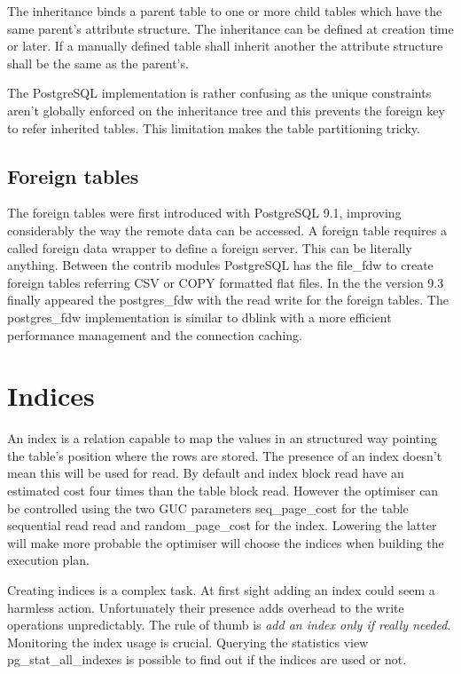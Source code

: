 The inheritance binds a parent table to one or more child tables which have 
the same parent's attribute structure. The inheritance can be defined at 
creation time or later. If a manually defined table shall inherit another the 
attribute structure shall be the same as the parent's.

The PostgreSQL implementation is rather confusing as the unique constraints 
aren't globally enforced on the inheritance tree and this prevents the foreign 
key to refer inherited tables. This limitation makes the table 
partitioning tricky.

\subsection{Foreign tables}
The foreign tables were first introduced with PostgreSQL 9.1, improving 
considerably the way the remote data can be accessed. 
A foreign table requires a called foreign data wrapper to define a foreign 
server. This can be literally anything. Between the contrib modules PostgreSQL 
has the file\_fdw to create foreign tables referring CSV or COPY formatted flat 
files. In the the version 9.3 finally appeared the postgres\_fdw with the read 
write for the foreign tables. The postgres\_fdw implementation is similar to 
dblink with a more efficient performance management and the connection caching.


\section{Indices}
An index is a relation capable to map the values in an structured way pointing
the table's position where the rows are stored. The presence of an index 
doesn't mean this will be used for read. By default and index block read have 
an estimated cost four times than the table block read. However the optimiser
can be controlled using the two GUC parameters seq\_page\_cost for the table 
 sequential read read and random\_page\_cost for the index. Lowering the latter 
will make more probable the optimiser will choose the indices when building the 
execution plan.

Creating indices is a complex task. At first sight adding an index could seem a 
harmless action. Unfortunately their presence adds overhead to the write 
operations unpredictably. The rule of thumb is \textit{add an index only 
if really needed}. Monitoring the index usage is crucial. Querying the 
statistics view pg\_stat\_all\_indexes is possible to find out if the indices 
are used or not.

